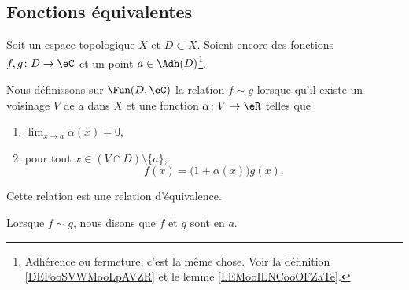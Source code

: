 \subsection{Fonctions équivalentes}

\begin{propositionDef}       \label{DEFooWDSAooKXZsZY}
    Soit un espace topologique \( X\) et \( D\subset X\). Soient encore des fonctions \( f,g\colon D\to \eC\) et un point \( a\in\Adh(D)\)\footnote{Adhérence ou fermeture, c'est la même chose. Voir la définition \ref{DEFooSVWMooLpAVZR} et le lemme \ref{LEMooILNCooOFZaTe}.}.

    Nous définissons sur \( \Fun(D,\eC)\) la relation \( f\sim g\) lorsque qu'il existe un voisinage \( V\) de \( a\) dans \( X\) et une fonction \( \alpha\colon V\to \eR\) telles que
    \begin{enumerate}
        \item
            \( \lim_{x\to a} \alpha(x)=0\),
        \item
            pour tout \( x\in (V\cap D)\setminus\{ a \}\), 
            \begin{equation}        \label{EQooQXKYooSDPpNq}
                f(x)=\big( 1+\alpha(x) \big)g(x).
            \end{equation}
    \end{enumerate}
    Cette relation est une relation d'équivalence.

    Lorsque \( f\sim g\), nous disons que \( f\) et \( g\) sont  en \( a\).
\end{propositionDef}

